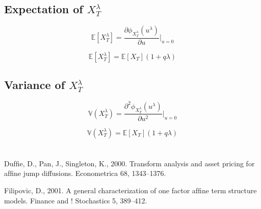 \documentclass[12pt]{article}
\theoremstyle{definition}
\begin{document}
 \subsection{Expectation of \(X_T ^ \lambda \)}
 \begin{equation}
 \mathbb{E}[X_T ^ \lambda]=\frac{\partial \phi_{X_T ^\lambda}(u^\lambda)}{\partial u} \big|_{u=0}
 \end{equation}
 
 \begin{equation}
 \mathbb{E}[X_T ^ \lambda]=\mathbb{E}[X_T](1+q\lambda)
 \end{equation}
 
  \subsection{Variance of \(X_T ^ \lambda \)}
 \begin{equation}
 \mathbb{V}(X_T ^ \lambda)=\frac{\partial^2 \phi_{X_T ^\lambda}(u^\lambda)}{\partial u^2} \big|_{u=0}
 \end{equation}
 
 \begin{equation}
 \mathbb{V}(X_T ^ \lambda)=\mathbb{E}[X_T](1+q\lambda)
 \end{equation}
\\
\\




Dufﬁe, D., Pan, J., Singleton, K., 2000. Transform analysis and asset pricing for afﬁne jump diffusions.
Econometrica 68, 1343–1376.

Filipovic, D., 2001. A general characterization of one factor afﬁne term structure models. Finance and !
Stochastics 5, 389–412.
\end{document}
